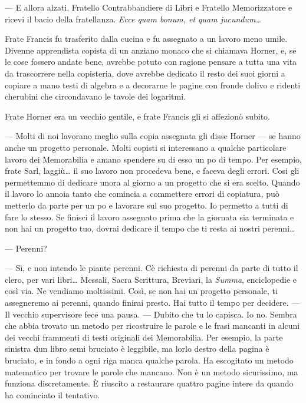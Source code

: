 --- E allora alzati, Fratello Contrabbandiere di Libri e Fratello
Memorizzatore e ricevi il bacio della fratellanza. \emph{Ecce quam
	bonum, et quam jucundum\ldots{}}

Frate Francis fu trasferito dalla cucina e fu assegnato a un lavoro meno
umile. Divenne apprendista copista di un anziano monaco che si chiamava
Horner, e, se le cose fossero andate bene, avrebbe potuto con ragione
pensare a tutta una vita da trascorrere nella copisteria, dove avrebbe
dedicato il resto dei suoi giorni a copiare a mano testi di algebra e a
decorarne le pagine con fronde d\textquotesingle olivo e ridenti
cherubini che circondavano le tavole dei logaritmi.

Frate Horner era un vecchio gentile, e frate Francis gli si affezionò
subito.

--- Molti di noi lavorano meglio sulla copia assegnata gli disse Horner
--- se hanno anche un progetto personale. Molti copisti si interessano a
qualche particolare lavoro dei Memorabilia e amano spendere su di esso
un po\textquotesingle{} di tempo. Per esempio, frate Sarl,
laggiù\ldots{} il suo lavoro non procedeva bene, e faceva degli errori.
Cosi gli permettemmo di dedicare un\textquotesingle ora al giorno a un
progetto che si era scelto. Quando il lavoro lo annoia tanto che
comincia a commettere errori di copiatura, può metterlo da parte per un
po\textquotesingle{} e lavorare sul suo progetto. Io permetto a tutti di
fare lo stesso. Se finisci il lavoro assegnato prima che la giornata sia
terminata e non hai un progetto tuo, dovrai dedicare il tempo che ti
resta ai nostri perenni\ldots{}

--- Perenni?

--- Sì, e non intendo le piante perenni. C\textquotesingle è richiesta
di perenni da parte di tutto il clero, per vari libri\ldots{} Messali,
Sacra Scrittura, Breviari, la \emph{Summa}, enciclopedie e così via. Ne
vendiamo moltissimi. Così, se non hai un progetto personale, ti
assegneremo ai perenni, quando finirai presto. Hai tutto il tempo per
decidere. --- Il vecchio supervisore fece una pausa. --- Dubito che tu
lo capisca. Io no. Sembra che abbia trovato un metodo per ricostruire le
parole e le frasi mancanti in alcuni dei vecchi frammenti di testi
originali dei Memorabilia. Per esempio, la parte sinistra
d\textquotesingle un libro semi bruciato è leggibile, ma
l\textquotesingle orlo destro della pagina è bruciato, e in fondo a ogni
riga manca qualche parola. Ha escogitato un metodo matematico per
trovare le parole che mancano. Non è un metodo sicurissimo, ma funziona
discretamente. È riuscito a restaurare quattro pagine intere da quando
ha cominciato il tentativo.

